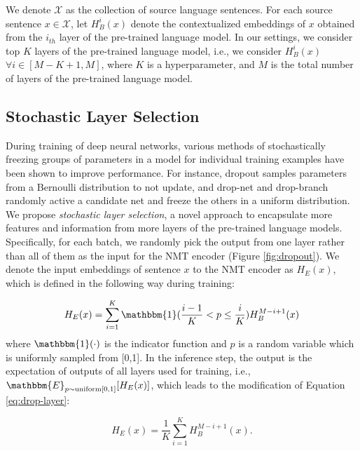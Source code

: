 \documentclass[11pt]{article}
\begin{document}
We denote $\mathcal{X}$ as the collection of source language sentences. For each source sentence $x\in\mathcal{X}$, let $H_B^i(x)$ denote the contextualized embeddings of $x$ obtained from the $i_{th}$ layer of the pre-trained language model. In our settings, we consider top $K$ layers of the pre-trained language model, i.e., we consider $H_B^i(x)$ $\forall i\in [M-K+1, M]$, where $K$ is a hyperparameter, and $M$ is the total number of layers of the pre-trained language model. 



\subsection{Stochastic Layer Selection}
During training of deep neural networks,  various methods of stochastically freezing groups of parameters in a model for individual training examples have been shown to improve performance. For instance, dropout \citep{srivastava2014dropout} samples parameters from a Bernoulli distribution to not update, and drop-net \citep{Zhu2020Incorporating} and drop-branch \cite{fan2020multi} randomly active a candidate net and freeze the others in a uniform distribution. We propose \textit{stochastic layer selection}, a novel approach to encapsulate more features and information from more layers of the pre-trained language models. Specifically, for each batch, we randomly pick the output from one layer rather than all of them as the input for the NMT encoder (Figure \ref{fig:dropout}). We denote the input embeddings of sentence $x$ to the NMT encoder as $H_E(x)$, which is defined in the following way during training:

\begin{equation}
    H_E(x) = \sum_{i=1}^K \mathbbm{1}(\frac{i-1}{K}<p\leq\frac{i}{K})H_B^{M-i+1}(x)
    \label{eq:drop-layer}
\end{equation}
where $\mathbbm{1}(\cdot)$ is the indicator function and $p$ is a random variable which is uniformly sampled from [0,1]. In the inference step, the output is the expectation of outputs of all layers used for training, i.e., $\mathbbm{E}_{p\sim\text{uniform}[0,1]}[H_E(x)]$, which leads to the modification of Equation \ref{eq:drop-layer}:

\begin{equation}
    H_E(x) = \frac{1}{K} \sum_{i=1}^K H_B^{M-i+1}(x).
    \label{eq:mean}
\end{equation}
\end{document}
